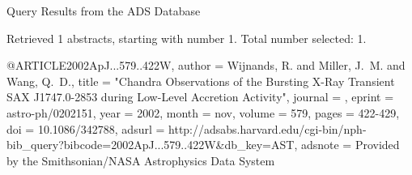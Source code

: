 Query Results from the ADS Database


Retrieved 1 abstracts, starting with number 1.  Total number selected: 1.

@ARTICLE{2002ApJ...579..422W,
   author = {{Wijnands}, R. and {Miller}, J.~M. and {Wang}, Q.~D.},
    title = "{Chandra Observations of the Bursting X-Ray Transient SAX J1747.0-2853 during Low-Level Accretion Activity}",
  journal = {\apj},
   eprint = {astro-ph/0202151},
     year = 2002,
    month = nov,
   volume = 579,
    pages = {422-429},
      doi = {10.1086/342788},
   adsurl = {http://adsabs.harvard.edu/cgi-bin/nph-bib_query?bibcode=2002ApJ...579..422W&db_key=AST},
  adsnote = {Provided by the Smithsonian/NASA Astrophysics Data System}
}


